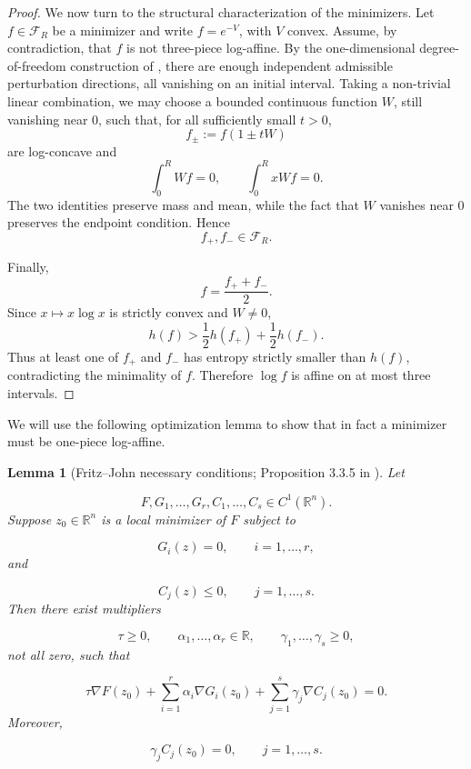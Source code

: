 \documentclass{article}
\theoremstyle{plain}
\newtheorem{lemma}[theorem]{Lemma}
\theoremstyle{definition}
\newcommand{\1}{\mathbf 1}
\begin{document}
\begin{proof}
We now turn to the structural characterization of the minimizers.
Let \(f\in\mathcal F_R\) be a minimizer and write \(f=e^{-V}\), with
\(V\) convex. 
Assume, by contradiction, that \(f\) is not
three-piece log-affine. By the one-dimensional degree-of-freedom
construction of
\cite[Proof of Proposition~2]{fradeliziguedon}, there are enough
independent admissible perturbation directions, all vanishing on an
initial interval. Taking a non-trivial linear combination, we may
choose a bounded continuous function \(W\), still vanishing near
\(0\), such that, for all sufficiently small \(t>0\),
\[
f_\pm:=f(1\pm tW)
\]
are log-concave and
\[
\int_0^R Wf=0,
\qquad
\int_0^R xWf=0.
\]
The two identities preserve mass and mean, while the fact that \(W\)
vanishes near \(0\) preserves the endpoint condition. Hence
\[
f_+,f_-\in\mathcal F_R.
\]

Finally,
\[
f=\frac{f_++f_-}{2}.
\]
Since \(x\mapsto x\log x\) is strictly convex and \(W\neq0\),
\[
h(f)>
\frac12h(f_+)+\frac12h(f_-).
\]
Thus at least one of \(f_+\) and \(f_-\) has entropy strictly smaller
than \(h(f)\), contradicting the minimality of \(f\). Therefore
\(\log f\) is affine on at most three intervals.
\end{proof}


We will use the following optimization lemma to show that in fact a minimizer must be one-piece log-affine. 
\begin{lemma}[Fritz--John necessary conditions; Proposition 3.3.5 in \cite{bertsekas}] \label{FJ}
Let 

\[
F,G_1,\dots,G_r,C_1,\dots,C_s\in C^1(\mathbb R^n).
\]
Suppose \(z_0\in \mathbb{R}^n\) is a local minimizer of \(F\) subject to

\[
G_i(z)=0,\qquad i=1,\dots,r,
\]
and

\[
C_j(z)\le0,\qquad j=1,\dots,s.
\]
Then there exist multipliers

\[
\tau\ge0,\qquad
\alpha_1,\dots,\alpha_r\in\mathbb R,
\qquad
\gamma_1,\dots,\gamma_s\ge0,
\]
not all zero, such that

\[
\tau\nabla F(z_0)
+
\sum_{i=1}^r \alpha_i\nabla G_i(z_0)
+
\sum_{j=1}^s \gamma_j\nabla C_j(z_0)=0.
\]
Moreover,

\[
\gamma_j C_j(z_0)=0,
\qquad j=1,\dots,s.
\]
\end{lemma}
\end{document}
